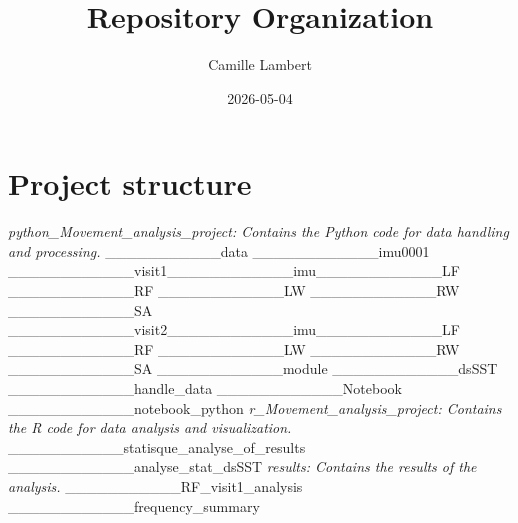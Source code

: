 \documentclass[
]{article}
\title{Repository Organization}
\author{Camille Lambert}
\date{2026-05-04}
\begin{document}
\maketitle

\section{Project structure}\label{project-structure}

\textbar{}\emph{python\_Movement\_analysis\_project: Contains the Python
code for data handling and processing.
\textbar{}}\_\_\_\_\_\_\_\_\_\_\_data \textbar{}
\textbar\_\_\_\_\_\_\_\_\_\_\_\_imu0001 \textbar{} \textbar{}
\textbar\_\_\_\_\_\_\_\_\_\_\_\_visit1\_\_\_\_\_\_\_\_\_\_\_\_imu\_\_\_\_\_\_\_\_\_\_\_\_LF
\textbar{} \textbar{} \textbar{} \textbar\_\_\_\_\_\_\_\_\_\_\_\_RF
\textbar{} \textbar{} \textbar{} \textbar\_\_\_\_\_\_\_\_\_\_\_\_LW
\textbar{} \textbar{} \textbar{} \textbar\_\_\_\_\_\_\_\_\_\_\_\_RW
\textbar{} \textbar{} \textbar{} \textbar\_\_\_\_\_\_\_\_\_\_\_\_SA
\textbar{} \textbar{}
\textbar\_\_\_\_\_\_\_\_\_\_\_\_visit2\_\_\_\_\_\_\_\_\_\_\_\_imu\_\_\_\_\_\_\_\_\_\_\_\_LF
\textbar{} \textbar{} \textbar\_\_\_\_\_\_\_\_\_\_\_\_RF \textbar{}
\textbar{} \textbar\_\_\_\_\_\_\_\_\_\_\_\_LW \textbar{} \textbar{}
\textbar\_\_\_\_\_\_\_\_\_\_\_\_RW \textbar{} \textbar{}
\textbar\_\_\_\_\_\_\_\_\_\_\_\_SA \textbar{} \textbar{}
\textbar\_\_\_\_\_\_\_\_\_\_\_\_module \textbar{}
\textbar\_\_\_\_\_\_\_\_\_\_\_\_dsSST \textbar{}
\textbar\_\_\_\_\_\_\_\_\_\_\_\_handle\_data \textbar{} \textbar{}
\textbar\_\_\_\_\_\_\_\_\_\_\_\_Notebook \textbar{}
\textbar\_\_\_\_\_\_\_\_\_\_\_\_notebook\_python \textbar{} \textbar{}
\textbar{}\emph{r\_Movement\_analysis\_project: Contains the R code for
data analysis and visualization. \textbar{}
\textbar{}}\_\_\_\_\_\_\_\_\_\_\_statisque\_analyse\_of\_results
\textbar{} \textbar\_\_\_\_\_\_\_\_\_\_\_\_analyse\_stat\_dsSST
\textbar{} \textbar{} \textbar{}\emph{results: Contains the results of
the analysis. \textbar{}
\textbar{}}\_\_\_\_\_\_\_\_\_\_\_RF\_visit1\_analysis \textbar{}
\textbar\_\_\_\_\_\_\_\_\_\_\_\_frequency\_summary
\end{document}
